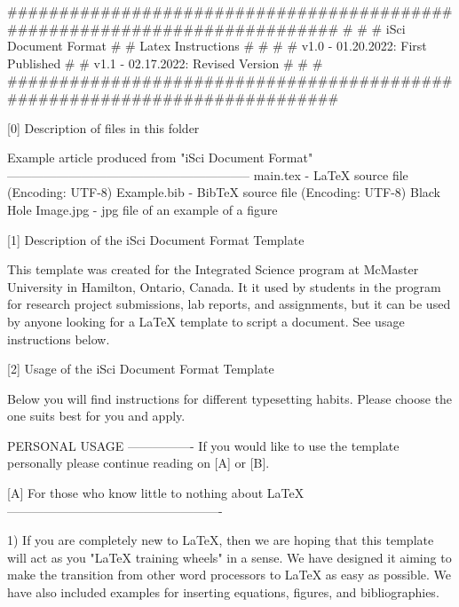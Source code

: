 ###########################################################################
#                                                                         #
#                          iSci Document Format                           #
#                           Latex Instructions                            #
#                                                                         #
# v1.0 - 01.20.2022: First Published                                       #
# v1.1 - 02.17.2022: Revised Version                                      #
#                                                                         #
###########################################################################

[0] Description of files in this folder

    Example article produced from "iSci Document Format"
    -----------------------------------------------------------
    main.tex - LaTeX source file (Encoding: UTF-8)
    Example.bib - BibTeX source file (Encoding: UTF-8)
    Black Hole Image.jpg - jpg file of an example of a figure

[1] Description of the iSci Document Format Template
    
    This template was created for the Integrated Science program 
    at McMaster University in Hamilton, Ontario, Canada. It it used 
    by students in the program for research project submissions, lab
    reports, and assignments, but it can be used by anyone looking for
    a LaTeX template to script a document. See usage instructions below.

[2] Usage of the iSci Document Format Template

    Below you will find instructions for different typesetting habits.
    Please choose the one suits best for you and apply.

    PERSONAL USAGE
    ----------------
    If you would like to use the template personally please continue
    reading on [A] or [B].

[A] For those who know little to nothing about LaTeX
----------------------------------------------------

    1) If you are completely new to LaTeX, then we are
    hoping that this template will act as you "LaTeX 
    training wheels" in a sense. We have designed it 
    aiming to make the transition from other word  
    processors to LaTeX as easy as possible. We have 
    also included examples for inserting equations,
    figures, and bibliographies. 
    

